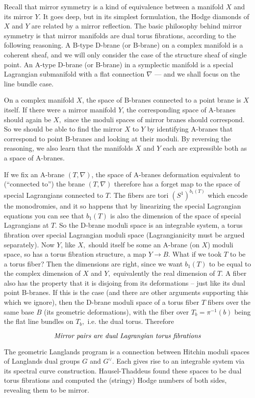 Recall that mirror symmetry is a kind of equivalence between a manifold $X$ and its mirror $Y$.
It goes deep, but in its simplest formulation, the Hodge diamonds of $X$ and $Y$ are related
by a mirror reflection.
The basic philosophy behind mirror symmetry is that mirror manifolds are dual torus fibrations,
according to the following reasoning.  A B-type D-brane (or B-brane) on a complex manifold is a coherent sheaf,
and we will only consider the case of the structure sheaf of
single point.  An A-type D-brane (or B-brane) in a symplectic
manifold is a special Lagrangian submanifold with a flat connection $\nabla$
--- and we shall focus on the line bundle case.

On a complex manifold $X$, the space of B-branes connected to a point brane is $X$ itself.
If there were a mirror manifold $Y$, the corresponding space of A-branes should again be $X,$
since the moduli spaces of mirror branes should correspond.  So
we should be able to find the mirror $X$ to $Y$ by identifying A-branes that correspond to point B-branes
and looking at their moduli.  By reversing the reasoning,
we also learn that the manifolds $X$ and $Y$ each are expressible
both as a space of A-branes.

If we fix an A-brane $(T,\nabla)$, the space of A-branes deformation equivalent
to (``connected to'') the brane $(T,\nabla)$ therefore has a forget map to the space
of special Lagrangians connected to $T$.  The fibers are tori $(S^1)^{b_1(T)}$ which encode
the monodromies, and it so happens
that by  linearizing
the special Lagrangian equations you can see that $b_1(T)$ is also the dimension of the space
of special Lagrangians at $T.$  So the D-brane moduli space is an integrable system, a torus
fibration over special Lagrangian moduli space (Lagrangianicity must be argued separately).
Now $Y$, like $X,$ should itself be some an A-brane (on $X$) moduli space, so has a torus
fibration structure, a map $Y\to B$.  What if we took $T$ to be a torus fiber?
Then the dimensions are right, since we want $b_1(T)$ to be equal to the complex dimension
of $X$ and $Y,$ equivalently the real dimension of $T$.  A fiber also has the property that it is disjoing from its deformations -- just like
its dual point B-branes.  If this is the case (and there are other arguments supporting this which
we ignore), then the D-brane moduli space of a torus fiber $T$ fibers over the same base $B$ (its geometric
deformations), with the fiber over $T_b = \pi^{-1}(b)$ being the flat line bundles on $T_b,$ i.e. the
dual torus.  Therefore

$$\emph{Mirror pairs are dual Lagrangian torus fibrations}$$

The geometric Langlands program is a connection between Hitchin moduli spaces of
Langlands dual groups $G$ and $G^\vee.$
Each gives rise to an integrable system via its spectral curve construction.
Hausel-Thaddeus found these spaces to be dual torus fibrations
and computed the (stringy) Hodge numbers of both sides, revealing them to be mirror.


